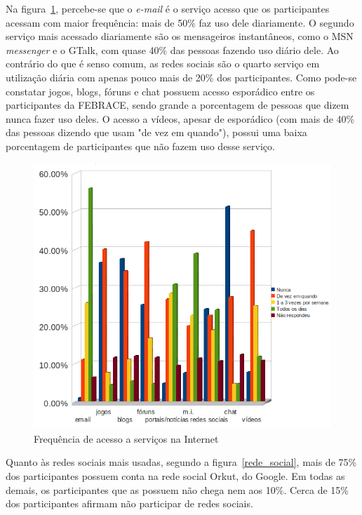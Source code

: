   Na figura~\ref{atividade}, percebe-se que o \textit{e-mail} é o serviço acesso que os participantes acessam com maior frequência: mais de 50\% 
faz uso dele diariamente. O segundo serviço mais acessado diariamente são os mensageiros instantâneos, como o MSN \textit{messenger} e o GTalk, 
com quase 40\%  das pessoas fazendo uso diário dele. Ao contrário do que é senso comum, as redes sociais são o quarto serviço em utilização diária 
com apenas pouco mais de 20\% dos participantes. Como pode-se constatar jogos, blogs, fóruns e chat possuem acesso esporádico entre os participantes 
da FEBRACE, sendo grande a porcentagem de pessoas que dizem nunca fazer uso deles. O acesso a vídeos, apesar de esporádico (com mais de 40\% das 
pessoas dizendo que usam "de vez em quando"), possui uma baixa porcentagem de participantes que não fazem uso desse serviço.

  \begin{figure}
      \begin{center}
	\includegraphics[width=0.7\linewidth]{arquivos/atividade.png}
      \end{center}
      \caption{Frequência de acesso a serviços na Internet}
      \label{atividade}
  \end{figure}

  Quanto às redes sociais mais usadas, segundo a figura~\ref{rede_social}, mais de 75\% dos participantes possuem conta na rede social Orkut, do 
Google. Em todas as demais, os participantes que as possuem não chega nem aos 10\%. Cerca de 15\% dos participantes afirmam não participar de redes 
sociais.

